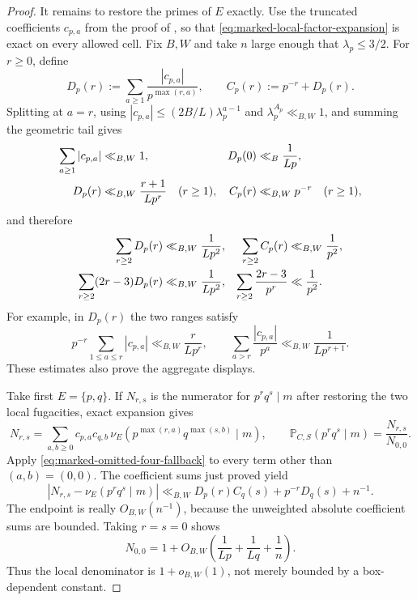 \documentclass[11pt]{article}
\numberwithin{equation}{section}
\theoremstyle{definition}
\theoremstyle{remark}
\newcommand{\1}{\mathbf 1}
\begin{document}
\begin{proof}
It remains to restore the primes of \(E\) exactly.  Use the truncated
coefficients \(c_{p,a}\) from the proof of
, so that
\eqref{eq:marked-local-factor-expansion} is exact on every allowed cell.
Fix \(B,W\) and take \(n\) large enough that \(\lambda_p\le3/2\).
For \(r\ge0\), define
\[
 D_p(r):=\sum_{a\ge1}\frac{|c_{p,a}|}{p^{\max(r,a)}},
 \qquad C_p(r):=p^{-r}+D_p(r).
\]
Splitting at \(a=r\), using
\(|c_{p,a}|\le(2B/L)\lambda_p^{a-1}\) and
\(\lambda_p^{A_p}\ll_{B,W}1\), and summing the geometric tail gives
\begin{align}
 \sum_{a\ge1}|c_{p,a}|&\ll_{B,W}1,
 &D_p(0)&\ll_B\frac1{Lp},\notag\\
 D_p(r)&\ll_{B,W}\frac{r+1}{Lp^r}\quad(r\ge1),
 &C_p(r)&\ll_{B,W}p^{-r}\quad(r\ge1),
 \label{eq:marked-four-local-coefficients}
\end{align}
and therefore
\begin{align}
 \sum_{r\ge2}D_p(r)&\ll_{B,W}\frac1{Lp^2},
 &\sum_{r\ge2}C_p(r)&\ll_{B,W}\frac1{p^2},\notag\\
 \sum_{r\ge2}(2r-3)D_p(r)&\ll_{B,W}\frac1{Lp^2},
 &\sum_{r\ge2}\frac{2r-3}{p^r}&\ll\frac1{p^2}.
 \label{eq:marked-four-local-aggregate}
\end{align}
For example, in \(D_p(r)\) the two ranges satisfy
\[
 p^{-r}\sum_{1\le a\le r}|c_{p,a}|
 \ll_{B,W}\frac r{Lp^r},\qquad
 \sum_{a>r}\frac{|c_{p,a}|}{p^a}
 \ll_{B,W}\frac1{Lp^{r+1}}.
\]
These estimates also prove the aggregate displays.

Take first \(E=\{p,q\}\).  If \(N_{r,s}\) is the numerator for
\(p^rq^s\mid m\) after restoring the two local fugacities, exact
expansion gives
\begin{equation}
 N_{r,s}=\sum_{a,b\ge0}c_{p,a}c_{q,b}\,
 \nu_E\!\left(p^{\max(r,a)}q^{\max(s,b)}\mid m\right),
 \qquad
 \mathbb P_{C,S}(p^rq^s\mid m)=\frac{N_{r,s}}{N_{0,0}}.
 \label{eq:marked-four-exact-restoration}
\end{equation}
Apply \eqref{eq:marked-omitted-four-fallback} to every term other than
\((a,b)=(0,0)\).  The coefficient sums just proved yield
\begin{equation}
 |N_{r,s}-\nu_E(p^rq^s\mid m)|
 \ll_{B,W}D_p(r)C_q(s)+p^{-r}D_q(s)+n^{-1}.
 \label{eq:marked-four-restoration-error}
\end{equation}
The endpoint is really \(O_{B,W}(n^{-1})\), because the unweighted
absolute coefficient sums are bounded.  Taking \(r=s=0\) shows
\begin{equation}
 N_{0,0}=1+O_{B,W}\!\left(\frac1{Lp}+\frac1{Lq}+\frac1n\right).
 \label{eq:marked-four-restoration-denominator}
\end{equation}
Thus the local denominator is \(1+o_{B,W}(1)\), not merely bounded by a
box-dependent constant.


\end{proof}
\end{document}
